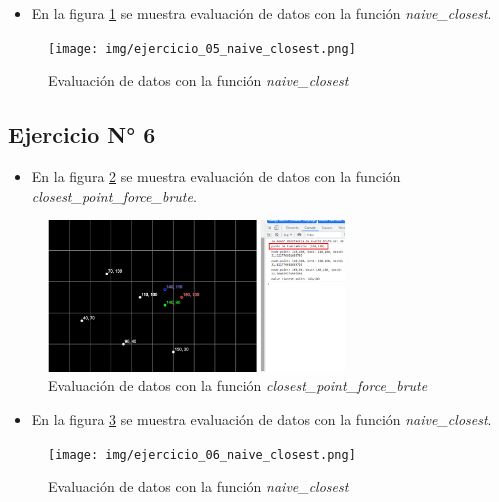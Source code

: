 \documentclass{article}
\begin{document}
\begin{itemize}
	\item En la figura \ref{fig:ejercicio_05_naive_closest} se muestra evaluación de datos con la función \textit{naive\_closest}.
\end{itemize}
\begin{figure}[h!]
	\centering
	\texttt{[image: img/ejercicio\_05\_naive\_closest.png]}
	\caption{Evaluación de datos con la función \textit{naive\_closest}}
	\label{fig:ejercicio_05_naive_closest}
\end{figure}

\clearpage
\subsection{Ejercicio N° 6}
\begin{itemize}
	\item En la figura \ref{fig:ejercicio_06_closest_point_brute_force} se muestra evaluación de datos con la función \textit{closest\_point\_force\_brute}.
\end{itemize}
\begin{figure}[h!]
	\centering
	\includegraphics[width=0.7\textwidth]{img/ejercicio_06_closest_point_brute_force.png}
	\caption{Evaluación de datos con la función \textit{closest\_point\_force\_brute}}
	\label{fig:ejercicio_06_closest_point_brute_force}
\end{figure}

\begin{itemize}
	\item En la figura \ref{fig:ejercicio_06_naive_closest} se muestra evaluación de datos con la función \textit{naive\_closest}.
\end{itemize}
\begin{figure}[h!]
	\centering
	\texttt{[image: img/ejercicio\_06\_naive\_closest.png]}
	\caption{Evaluación de datos con la función \textit{naive\_closest}}
	\label{fig:ejercicio_06_naive_closest}
\end{figure}

\clearpage
\end{document}
